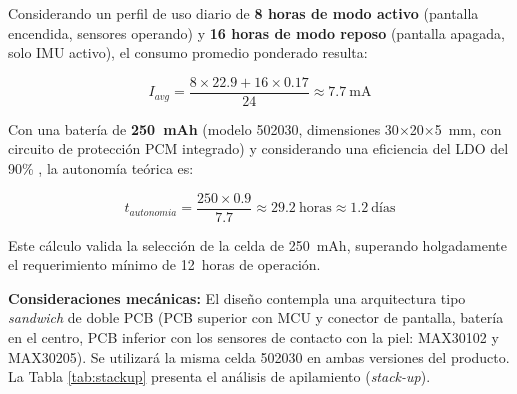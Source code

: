 \documentclass[letterpaper,11pt]{article}
\newcommand{\rtabla}[1]{Tabla \ref{#1}}
\begin{document}
Considerando un perfil de uso diario de \textbf{8 horas de modo activo} (pantalla encendida, sensores operando) y \textbf{16 horas de modo reposo} (pantalla apagada, solo IMU activo), el consumo promedio ponderado resulta:

\begin{equation}
    I_{avg} = \frac{8 \times 22.9 + 16 \times 0.17}{24} \approx 7.7~\text{mA}
\end{equation}

Con una batería de \textbf{250~mAh} (modelo 502030, dimensiones 30$\times$20$\times$5~mm, con circuito de protección PCM integrado) y considerando una eficiencia del LDO del 90\% \citep{me6211_ds}, la autonomía teórica es:

\begin{equation}
    t_{autonomia} = \frac{250 \times 0.9}{7.7} \approx 29.2~\text{horas} \approx 1.2~\text{días}
\end{equation}

Este cálculo valida la selección de la celda de 250~mAh, superando holgadamente el requerimiento mínimo de 12~horas de operación.

\textbf{Consideraciones mecánicas:} El diseño contempla una arquitectura tipo \textit{sandwich} de doble PCB (PCB superior con MCU y conector de pantalla, batería en el centro, PCB inferior con los sensores de contacto con la piel: MAX30102 y MAX30205). Se utilizará la misma celda 502030 en ambas versiones del producto. La \rtabla{tab:stackup} presenta el análisis de apilamiento (\textit{stack-up}).
\end{document}
